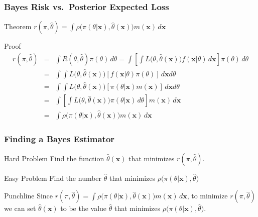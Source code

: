 \begin{frame}
  \frametitle{Bayes Risk vs.\ Posterior Expected Loss}
  \begin{block}{Theorem}
    $r(\pi, \widehat{\theta}) = \displaystyle\int \rho\big(\pi(\theta|\mathbf{x}), \widehat{\theta}(\mathbf{x})\big) m(\mathbf{x}) \, d\mathbf{x}$
  \end{block}

  \begin{block}{Proof}
    \vspace{-2em}
    \small
    \begin{eqnarray*}
      r(\pi,\widehat{\theta}) &=& \int R(\theta, \widehat{\theta}) \pi(\theta)\, d\theta = \int\left[ \int L\big(\theta, \widehat{\theta}(\mathbf{x})\big) f(\mathbf{x}|\theta)\, d\mathbf{x} \right]\pi(\theta)\, d\theta\\
      &=& \int \int L\big(\theta, \widehat{\theta}(\mathbf{x})\big) \left[f(\mathbf{x}|\theta)\pi(\theta)\right] \, d\mathbf{x}d\theta\\
      &=& \int \int L\big(\theta, \widehat{\theta}(\mathbf{x})\big) \left[\pi(\theta|\mathbf{x})m(\mathbf{x})\right] \, d\mathbf{x}d\theta\\
      &=& \int \left[\int L\big(\theta, \widehat{\theta}(\mathbf{x})\big) \pi(\theta|\mathbf{x}) \, d\theta \right] m(\mathbf{x})\, d\mathbf{x}\\
      &=& \int \rho\big(\pi(\theta|\mathbf{x}), \widehat{\theta}(\mathbf{x})\big) m(\mathbf{x}) \, d\mathbf{x}
    \end{eqnarray*}
  \end{block}
\end{frame}
\begin{frame}
  \frametitle{Finding a Bayes Estimator}

  \begin{block}{Hard Problem}
    Find the \alert{function} $\widehat{\theta}(\mathbf{x})$ that minimizes $r(\pi, \widehat{\theta})$.
  \end{block}

  \begin{block}{Easy Problem}
    Find the \alert{number} $\widehat{\theta}$ that minimizes $\rho\big(\pi(\theta|\mathbf{x}), \widehat{\theta})$
  \end{block}

  \begin{block}{Punchline}
    Since $r(\pi, \widehat{\theta}) = \displaystyle \int \rho\big(\pi(\theta|\mathbf{x}), \widehat{\theta}(\mathbf{x})\big) m(\mathbf{x}) \, d\mathbf{x}$, to minimize $r(\pi,\widehat{\theta})$ we can set $\widehat{\theta}(\mathbf{x})$ to be the value $\widehat{\theta}$ that minimizes $\rho\big(\pi(\theta|\mathbf{x}),\widehat{\theta})$.
  \end{block}

\end{frame}
